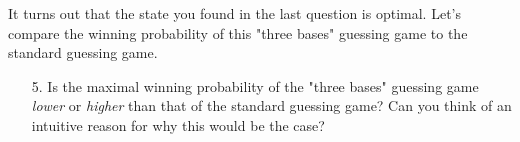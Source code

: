 \begin{exercises}
\begin{enumerate}
\begin{statements}
\end{statements}
\end{enumerate}
It turns out that the state you found in the last question is optimal. Let's compare the winning probability of this "three bases" guessing game to the standard guessing game.
\begin{enumerate}
\item[5.] Is the maximal winning probability of the "three bases" guessing game \emph{lower} or \emph{higher} than that of the standard guessing game? Can you think of an intuitive reason for why this would be the case?
\end{enumerate}
\end{exercises}
